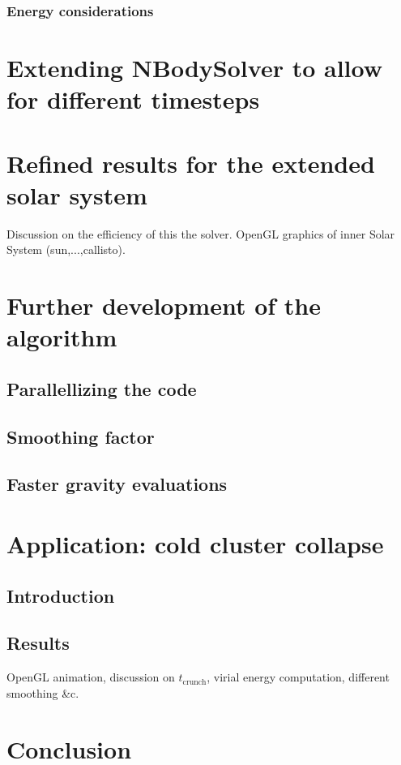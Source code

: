 \documentclass[11pt, oneside]{article}   	%
\begin{document}
\subsubsection{Energy considerations}

\section{Extending NBodySolver to allow for different timesteps}

\section{Refined results for the extended solar system}
Discussion on the efficiency of this the solver. 
OpenGL graphics of inner Solar System (sun,...,callisto).

\section{Further development of the algorithm}
\subsection{Parallellizing the code}
\subsection{Smoothing factor}
\subsection{Faster gravity evaluations}

\section{Application: cold cluster collapse}
\subsection{Introduction}
\subsection{Results}
OpenGL animation, discussion on $t_{\mathrm{crunch}}$, virial energy computation, different smoothing \&c. 

\section{Conclusion}
\end{document}
